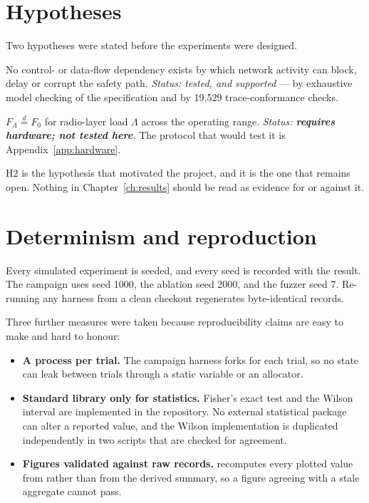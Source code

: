 \section{Hypotheses}

Two hypotheses were stated before the experiments were designed.

\begin{description}[leftmargin=2.4em,itemsep=5pt]
  \item[H1 (logical isolation).] No control- or data-flow dependency exists by which network
        activity can block, delay or corrupt the safety path.
        \emph{Status: tested, and supported} — by exhaustive model checking of the
         specification and by 19,529 trace-conformance checks.
  \item[H2 (timing isolation).] $F_{\Lambda} \stackrel{d}{=} F_{0}$ for radio-layer load
        $\Lambda$ across the operating range.
        \emph{Status: \textbf{requires hardware; not tested here}.} The protocol that would
        test it is Appendix~\ref{app:hardware}.
\end{description}

H2 is the hypothesis that motivated the project, and it is the one that remains open. Nothing in
Chapter~\ref{ch:results} should be read as evidence for or against it.

\section{Determinism and reproduction}

Every simulated experiment is seeded, and every seed is recorded with the result. The campaign
uses seed 1000, the ablation seed 2000, and the fuzzer seed 7. Re-running any harness from a
clean checkout regenerates byte-identical records.

Three further measures were taken because reproducibility claims are easy to make and hard to
honour:

\begin{itemize}[leftmargin=1.6em,itemsep=4pt]
  \item \textbf{A process per trial.} The campaign harness forks for each trial, so no state
        can leak between trials through a static variable or an allocator.
  \item \textbf{Standard library only for statistics.} Fisher's exact test and the Wilson
        interval are implemented in the repository. No external statistical package can alter a
        reported value, and the Wilson implementation is duplicated independently in two scripts
        that are checked for agreement.
  \item \textbf{Figures validated against raw records.}
         recomputes every plotted value from
         rather than from the derived summary, so a figure agreeing with a
        stale aggregate cannot pass.
\end{itemize}

